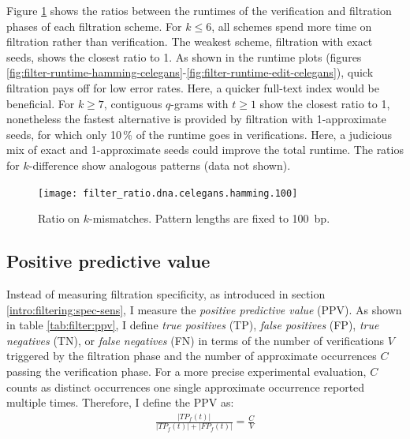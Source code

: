 Figure \ref{fig:filter-ratio-hamming-celegans} shows the ratios between the runtimes of the verification and filtration phases of each filtration scheme.
For $k \leq 6$, all schemes spend more time on filtration rather than verification.
The weakest scheme, filtration with exact seeds, shows the closest ratio to 1.
As shown in the runtime plots (figures \ref{fig:filter-runtime-hamming-celegans}-\ref{fig:filter-runtime-edit-celegans}), quick filtration pays off for low error rates.
Here, a quicker full-text index would be beneficial.
For $k \geq 7$, contiguous $q$-grams with $t \geq 1$ show the closest ratio to 1, nonetheless the fastest alternative is provided by filtration with 1-approximate seeds, for which only 10\,\% of the runtime goes in verifications.
Here, a judicious mix of exact and 1-approximate seeds could improve the total runtime.
The ratios for $k$-difference show analogous patterns (data not shown).

\begin{figure}[h]
\begin{center}
\caption[Ratio on $k$-mismatches]{Ratio on $k$-mismatches. Pattern lengths are fixed to 100~bp.}
\label{fig:filter-ratio-hamming-celegans}
\texttt{[image: filter\_ratio.dna.celegans.hamming.100]}
\end{center}
\end{figure}


\subsection{Positive predictive value}

Instead of measuring filtration specificity, as introduced in section \ref{intro:filtering:spec-sens}, I measure the \emph{positive predictive value} (PPV).
As shown in table \ref{tab:filter:ppv}, I define \emph{true positives} (TP), \emph{false positives} (FP), \emph{true negatives} (TN), or \emph{false negatives} (FN) in terms of the number of verifications $V$ triggered by the filtration phase and the number of approximate occurrences $C$ passing the verification phase.
For a more precise experimental evaluation, $C$ counts as distinct occurrences one single approximate occurrence reported multiple times.
Therefore, I define the PPV as:
\begin{eqnarray}
\frac{|TP_f(t)|}{|TP_f(t)| + |FP_f(t)|} = \frac{C}{V}
\end{eqnarray}

